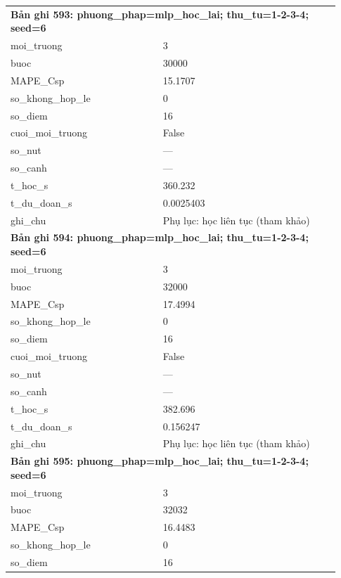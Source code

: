 \begin{longtable}{p{0.43\linewidth}p{0.50\linewidth}}
\midrule
\multicolumn{2}{p{0.95\linewidth}}{\textbf{Bản ghi 593: phuong\_phap=mlp\_hoc\_lai; thu\_tu=1-2-3-4; seed=6}} \\
moi\_\allowbreak truong & 3 \\
buoc & 30000 \\
MAPE\_\allowbreak Csp & 15.1707 \\
so\_\allowbreak khong\_\allowbreak hop\_\allowbreak le & 0 \\
so\_\allowbreak diem & 16 \\
cuoi\_\allowbreak moi\_\allowbreak truong & False \\
so\_\allowbreak nut & — \\
so\_\allowbreak canh & — \\
t\_\allowbreak hoc\_\allowbreak s & 360.232 \\
t\_\allowbreak du\_\allowbreak doan\_\allowbreak s & 0.0025403 \\
ghi\_\allowbreak chu & Phụ lục: học liên tục (tham khảo) \\
\midrule
\multicolumn{2}{p{0.95\linewidth}}{\textbf{Bản ghi 594: phuong\_phap=mlp\_hoc\_lai; thu\_tu=1-2-3-4; seed=6}} \\
moi\_\allowbreak truong & 3 \\
buoc & 32000 \\
MAPE\_\allowbreak Csp & 17.4994 \\
so\_\allowbreak khong\_\allowbreak hop\_\allowbreak le & 0 \\
so\_\allowbreak diem & 16 \\
cuoi\_\allowbreak moi\_\allowbreak truong & False \\
so\_\allowbreak nut & — \\
so\_\allowbreak canh & — \\
t\_\allowbreak hoc\_\allowbreak s & 382.696 \\
t\_\allowbreak du\_\allowbreak doan\_\allowbreak s & 0.156247 \\
ghi\_\allowbreak chu & Phụ lục: học liên tục (tham khảo) \\
\midrule
\multicolumn{2}{p{0.95\linewidth}}{\textbf{Bản ghi 595: phuong\_phap=mlp\_hoc\_lai; thu\_tu=1-2-3-4; seed=6}} \\
moi\_\allowbreak truong & 3 \\
buoc & 32032 \\
MAPE\_\allowbreak Csp & 16.4483 \\
so\_\allowbreak khong\_\allowbreak hop\_\allowbreak le & 0 \\
so\_\allowbreak diem & 16 \\

\end{longtable}
